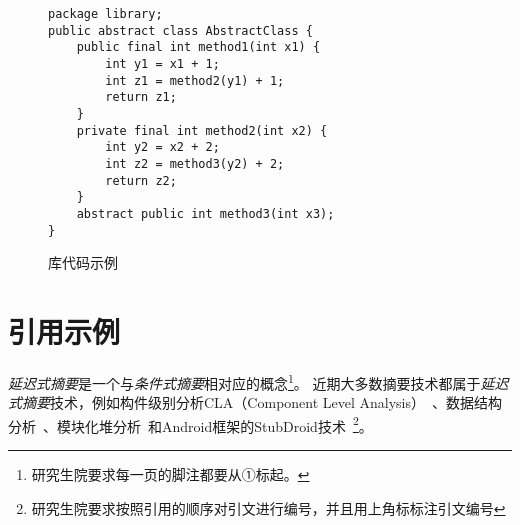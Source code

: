 \begin{figure}[htbp]
\begin{lstlisting}
package library;
public abstract class AbstractClass {
	public final int method1(int x1) {
		int y1 = x1 + 1;
		int z1 = method2(y1) + 1;
		return z1;
	}
	private final int method2(int x2) {
		int y2 = x2 + 2;
		int z2 = method3(y2) + 2;
		return z2;
	}
	abstract public int method3(int x3);
}
\end{lstlisting}
\caption{库代码示例}\label{fig:AbsClass}
\end{figure}

\section{引用示例}

\textit{延迟式摘要}是一个与\textit{条件式摘要}相对应的概念\footnote{研究生院要求每一页的脚注都要从①标起。}。
近期大多数摘要技术都属于\textit{延迟式摘要}技术，例如构件级别分析CLA（Component Level Analysis）~\supercite{rountev2006interprocedural,DBLP:conf/cc/RountevSX08}、数据结构分析~\supercite{DBLP:conf/pldi/LattnerLA07}、模块化堆分析~\supercite{Madhaven2012modular}和Android框架的StubDroid技术~\supercite{BoddenICSE16}\footnote{研究生院要求按照引用的顺序对引文进行编号，并且用上角标标注引文编号}。

